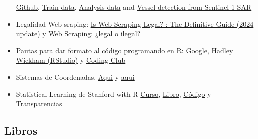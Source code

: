 \documentclass[
]{article}
\begin{document}
\begin{itemize}
  \href{https://github.com/GlobalFishingWatch/paper-industrial-activity/tree/main}{Github}.
  \href{https://figshare.com/articles/journal_contribution/Satellite_mapping_reveals_extensive_industrial_activity_at_sea_-_training_data/24309469}{Train
  data}.
  \href{https://figshare.com/articles/journal_contribution/Satellite_mapping_reveals_extensive_industrial_activity_at_sea_-_analysis_data/24309475}{Analysis
  data} and
  \href{https://globalfishingwatch.org/data-download/datasets/public-sar-vessel-detections:v20231026}{Vessel
  detection from Sentinel-1 SAR}
\item
  Legalidad Web sraping:
  \href{https://prowebscraper.com/blog/is-web-scraping-legal/}{Is Web
  Scraping Legal? : The Definitive Guide (2024 update)} y
  \href{https://ecija.com/web-scraping-legal-ilegal/}{Web Scraping:
  ¿legal o ilegal?}
\item
  Pautas para dar formato al código programando en R:
  \href{https://google.github.io/styleguide/Rguide.xml}{Google},
  \href{http://adv-r.had.co.nz/Style.html}{Hadley Wickham (RStudio)} y
  \href{https://ourcodingclub.github.io/2017/04/25/etiquette.html\#syntax}{Coding
  Club}
\item
  Sistemas de Coordenadas.
  \href{https://rspatial.org/spatial/rst/6-crs.html}{Aqui} y
  \href{https://www.nceas.ucsb.edu/~frazier/RSpatialGuides/OverviewCoordinateReferenceSystems.pdf}{aqui}
\item
  Statistical Learning de Stanford with R
  \href{https://online.stanford.edu/courses/sohs-ystatslearning-statistical-learning-r}{Curso},
  \href{https://hastie.su.domains/ElemStatLearn/}{Libro},
  \href{https://github.com/khanhnamle1994/statistical-learning}{Código}
  y
  \href{https://github.com/khanhnamle1994/statistical-learning/tree/master/Lecture-Slides}{Transparencias}
\end{itemize}

\subsection{Libros}\label{libros}
\end{document}
